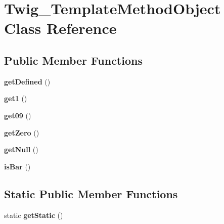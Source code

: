 \hypertarget{classTwig__TemplateMethodObject}{}\section{Twig\+\_\+\+Template\+Method\+Object Class Reference}
\label{classTwig__TemplateMethodObject}
\subsection*{Public Member Functions}
\begin{DoxyCompactItemize}
\item 
{\bfseries get\+Defined} ()\hypertarget{classTwig__TemplateMethodObject_ac1d04eaeb9740202c86bac96d92c79f2}{}\label{classTwig__TemplateMethodObject_ac1d04eaeb9740202c86bac96d92c79f2}

\item 
{\bfseries get1} ()\hypertarget{classTwig__TemplateMethodObject_a2422672a35fe4b1039fa5b28bf907a61}{}\label{classTwig__TemplateMethodObject_a2422672a35fe4b1039fa5b28bf907a61}

\item 
{\bfseries get09} ()\hypertarget{classTwig__TemplateMethodObject_a9826d988052875bd8eccd41120ec7d7e}{}\label{classTwig__TemplateMethodObject_a9826d988052875bd8eccd41120ec7d7e}

\item 
{\bfseries get\+Zero} ()\hypertarget{classTwig__TemplateMethodObject_a93e449191f11fc40b59a1806883e954c}{}\label{classTwig__TemplateMethodObject_a93e449191f11fc40b59a1806883e954c}

\item 
{\bfseries get\+Null} ()\hypertarget{classTwig__TemplateMethodObject_a03582ecd11680557eeac7d9a165876f1}{}\label{classTwig__TemplateMethodObject_a03582ecd11680557eeac7d9a165876f1}

\item 
{\bfseries is\+Bar} ()\hypertarget{classTwig__TemplateMethodObject_a7da957f48fad0ad903391d8aa270aeb0}{}\label{classTwig__TemplateMethodObject_a7da957f48fad0ad903391d8aa270aeb0}

\end{DoxyCompactItemize}
\subsection*{Static Public Member Functions}
\begin{DoxyCompactItemize}
\item 
static {\bfseries get\+Static} ()\hypertarget{classTwig__TemplateMethodObject_a1ac15b0f8bce3d55859dc429866ad340}{}\label{classTwig__TemplateMethodObject_a1ac15b0f8bce3d55859dc429866ad340}

\end{DoxyCompactItemize}
